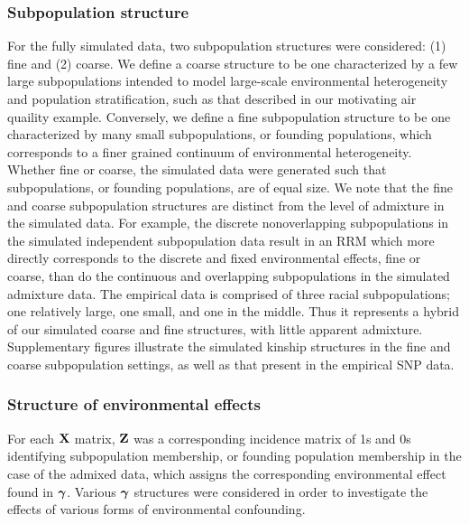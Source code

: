 \subsubsection{Subpopulation structure}
For the fully simulated data, two subpopulation structures were considered: (1) fine and (2) coarse. We define a coarse structure to be one characterized by a few large subpopulations intended to model large-scale environmental heterogeneity and population stratification, such as that described in our motivating air quaility example. Conversely, we define a fine subpopulation structure to be one characterized by many small subpopulations, or founding populations, which corresponds to a finer grained continuum of environmental heterogeneity. Whether fine or coarse, the simulated data were generated such that subpopulations, or founding populations, are of equal size. We note that the fine and coarse subpopulation structures are distinct from the level of admixture in the simulated data. For example, the discrete nonoverlapping subpopulations in the simulated independent subpopulation data result in an RRM which more directly corresponds to the discrete and fixed environmental effects, fine or coarse, than do the continuous and overlapping subpopulations in the simulated admixture data. The empirical data is comprised of three racial subpopulations; one relatively large, one small, and one in the middle. Thus it represents a hybrid of our simulated coarse and fine structures, with little apparent admixture. Supplementary figures  illustrate the simulated kinship structures in the fine and coarse subpopulation settings, as well as that present in the empirical SNP data. 

\subsubsection{Structure of environmental effects}
For each $\textbf{X}$ matrix, $\textbf{Z}$ was a corresponding incidence matrix of 1s and 0s identifying subpopulation membership, or founding population membership in the case of the admixed data, which assigns the corresponding environmental effect found in $\boldsymbol{\gamma}$. Various $\boldsymbol{\gamma}$ structures were considered in order to investigate the effects of various forms of environmental confounding. 

